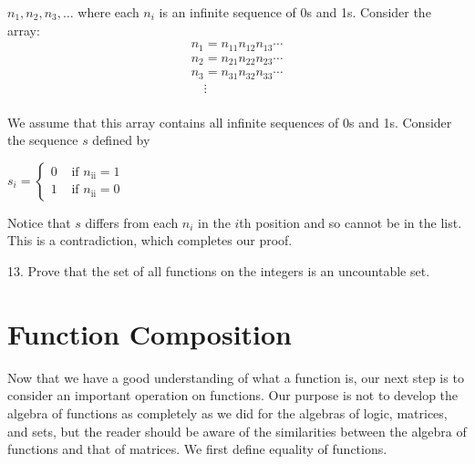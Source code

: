 \documentclass[10pt,]{book}
\theoremstyle{plain}
\theoremstyle{definition}
\theoremstyle{definition}
\theoremstyle{definition}
\begin{document}
\begin{exercisegroup}
 \(n_1,n_2,n_3,\ldots\) where each \(n_i\) is an infinite sequence of 0s and 1s. Consider the array:
\[
\begin{array}{c}
n_1=n_{11}n_{12}n_{13}\cdots\\
n_2=n_{21}n_{22}n_{23}\cdots\\
n_3=n_{31}n_{32}n_{33}\cdots\\
\quad \vdots\\
\end{array}
\] 
%
\par
We assume that this array contains all infinite sequences of 0s and 1s. Consider the sequence \(s\) defined by

\(s_i=\begin{cases}
 0 & \textrm{ if } n_{\textrm{ii}}=1 \\
 1 & \textrm{ if } n_{\textrm{ii}}=0
\end{cases}\)
%
\par
Notice that \(s\) differs from each \(n_i\) in the \(i\)th position and so cannot be in the list. This is a contradiction, which completes our proof.%
\item[13.]\hypertarget{exercise-22}{} Prove that the set of all functions on the integers is an uncountable set.%
\par\smallskip
\end{exercisegroup}
\par\smallskip\noindent
\typeout{************************************************}
\typeout{************************************************}
\section[Function Composition]{Function Composition}\label{s-function-composition}
\typeout{************************************************}
\typeout{************************************************}
Now that we have a good understanding of what a function is, our next step is to consider an important operation on functions. Our purpose is not
to develop the algebra of functions as completely as we did for the algebras of logic, matrices, and sets, but the reader should be aware of the
similarities between the algebra of functions and that of matrices. We first define equality of functions.%
\typeout{************************************************}
\typeout{************************************************}
\end{document}
